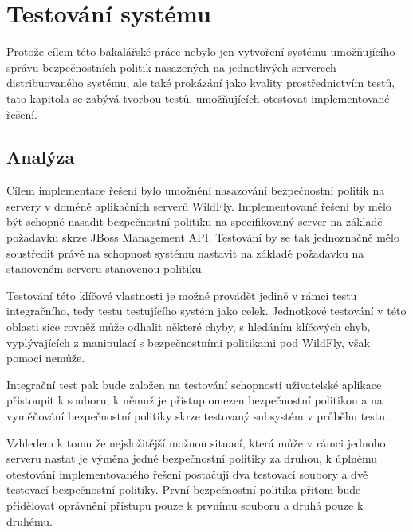 \chapter{Testování systému} \label{testovani}

Protože cílem této bakalářské práce nebylo jen vytvoření systému umožňujícího správu bezpečnostních politik nasazených na jednotlivých serverech distribuovaného systému, ale také prokázání jako kvality prostřednictvím testů, tato kapitola se zabývá tvorbou testů, umožňujících otestovat implementované řešení.

\section{Analýza} %

Cílem implementace řešení bylo umožnění nasazování bezpečnostní politik na servery v doméně aplikačních serverů WildFly.
Implementované řešení by mělo být schopné nasadit bezpečnostní politiku na specifikovaný server na základě požadavku skrze JBoss Management API.
Testování by se tak jednoznačně mělo soustředit právě na schopnost systému nastavit na základě požadavku na stanoveném serveru stanovenou politiku.

Testování této klíčové vlastnosti je možné provádět jedině v rámci testu integračního, tedy testu testujícího systém jako celek.
Jednotkové testování v této oblasti sice rovněž může odhalit některé chyby, s hledáním klíčových chyb, vyplývajících z manipulací s bezpečnostními politikami pod WildFly, však pomoci nemůže.

Integrační test pak bude založen na testování schopnosti uživatelské aplikace přistoupit k souboru, k němuž je přístup omezen bezpečnostní politikou a na vyměňování bezpečnostní politiky skrze testovaný subsystém v průběhu testu.

Vzhledem k tomu že nejsložitější možnou situací, která může v rámci jednoho serveru nastat je výměna jedné bezpečnostní politiky za druhou,
k úplnému otestování implementovaného řešení postačují dva testovací soubory a dvě testovací bezpečnostní politiky.
První bezpečnostní politika přitom bude přidělovat oprávnění přístupu pouze k prvnímu souboru a druhá pouze k druhému.

